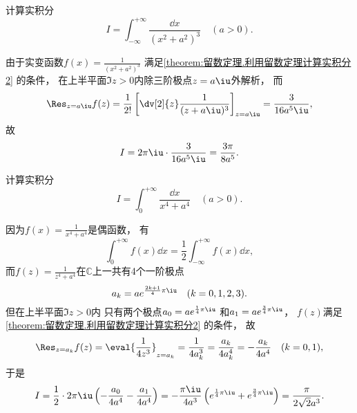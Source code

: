 \begin{example}
计算实积分\[
	I = \int_{-\infty}^{+\infty} \frac{\dd{x}}{(x^2+a^2)^3} \quad(a>0).
\]
\begin{solution}
由于实变函数\(f(x) = \frac{1}{(x^2+a^2)^3}\)
满足\cref{theorem:留数定理.利用留数定理计算实积分2} 的条件，
在上半平面\(\Im z > 0\)内除三阶极点\(z=a\iu\)外解析，
而\[
	\Res_{z=a\iu} f(z)
	= \frac{1}{2!} \left[ \dv[2]{z} \frac{1}{(z+a\iu)^3} \right]_{z=a\iu}
	= \frac{3}{16a^5\iu},
\]
故\[
	I = 2\pi\iu \cdot \frac{3}{16a^5\iu} = \frac{3\pi}{8a^5}.
\]
\end{solution}
\end{example}

\begin{example}
计算实积分\[
	I = \int_0^{+\infty} \frac{\dd{x}}{x^4+a^4} \quad(a>0).
\]
\begin{solution}
因为\(f(x) = \frac{1}{x^4+a^4}\)是偶函数，
有\[
	\int_0^{+\infty} f(x) \dd{x}
	= \frac{1}{2} \int_{-\infty}^{+\infty} f(x) \dd{x},
\]
而\(f(z) = \frac{1}{z^4+a^4}\)在\(\mathbb{C}\)上一共有4个一阶极点\[
	a_k = a e^{\frac{2k+1}{4}\pi\iu} \quad(k=0,1,2,3).
\]
但在上半平面\(\Im z > 0\)内
只有两个极点\(a_0 = a e^{\frac{1}{4}\pi\iu}\)
和\(a_1 = a e^{\frac{3}{4}\pi\iu}\)，
\(f(z)\)满足\cref{theorem:留数定理.利用留数定理计算实积分2} 的条件，
故\[
	\Res_{z=a_k} f(z)
	= \eval{\frac{1}{4z^3}}_{z=a_k}
	= \frac{1}{4a_k^3}
	= \frac{a_k}{4a_k^4}
	= -\frac{a_k}{4a^4}
	\quad(k=0,1),
\]
于是\[
	I = \frac{1}{2} \cdot 2\pi\iu \left(-\frac{a_0}{4a^4}-\frac{a_1}{4a^4}\right)
	= -\frac{\pi\iu}{4a^3} \left(e^{\frac{1}{4}\pi\iu} + e^{\frac{3}{4}\pi\iu}\right)
	= \frac{\pi}{2\sqrt{2}a^3}.
\]
\end{solution}
\end{example}

